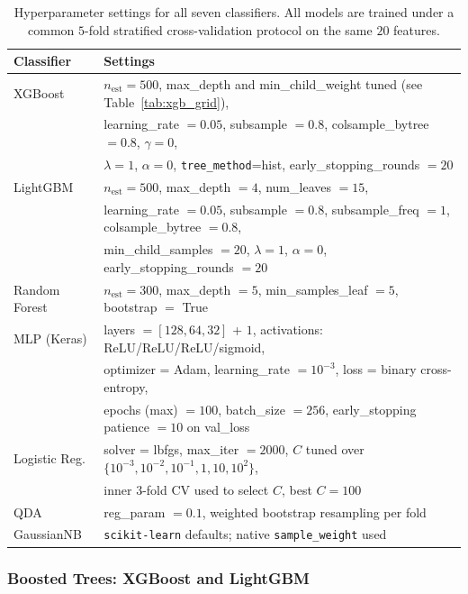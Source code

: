 \documentclass[conference]{IEEEtran}
\begin{document}
{\begin{table}[t]
\centering
\caption{Hyperparameter settings for all seven classifiers.
All models are trained under a common $5$-fold stratified
cross-validation protocol on the same $20$ features.}
\label{tab:hyperparameters}
\small
\begin{tabular}{l l}
\hline
\textbf{Classifier} & \textbf{Settings} \\
\hline
XGBoost      & $n_{\mathrm{est}}=500$, max\_depth and min\_child\_weight tuned (see Table~\ref{tab:xgb_grid}), \\
             & learning\_rate $=0.05$, subsample $=0.8$, colsample\_bytree $=0.8$, $\gamma=0$, \\
             & $\lambda=1$, $\alpha=0$, \texttt{tree\_method}=hist, early\_stopping\_rounds $=20$ \\
\hline
LightGBM     & $n_{\mathrm{est}}=500$, max\_depth $=4$, num\_leaves $=15$, \\
             & learning\_rate $=0.05$, subsample $=0.8$, subsample\_freq $=1$, colsample\_bytree $=0.8$, \\
             & min\_child\_samples $=20$, $\lambda=1$, $\alpha=0$, early\_stopping\_rounds $=20$ \\
\hline
Random Forest & $n_{\mathrm{est}}=300$, max\_depth $=5$, min\_samples\_leaf $=5$, bootstrap $=$ True \\
\hline
MLP (Keras)  & layers $=[128,64,32]$ + $1$, activations: ReLU/ReLU/ReLU/sigmoid, \\
             & optimizer = Adam, learning\_rate $=10^{-3}$, loss = binary cross-entropy, \\
             & epochs (max) $=100$, batch\_size $=256$, early\_stopping patience $=10$ on val\_loss \\
\hline
Logistic Reg.& solver = lbfgs, max\_iter $=2000$, $C$ tuned over $\{10^{-3},10^{-2},10^{-1},1,10,10^{2}\}$, \\
             & inner $3$-fold CV used to select $C$, best $C=100$ \\
\hline
QDA          & reg\_param $=0.1$, weighted bootstrap resampling per fold \\
\hline
GaussianNB   & \texttt{scikit-learn} defaults; native \texttt{sample\_weight} used \\
\hline
\end{tabular}
\end{table}
 
\subsubsection{Boosted Trees: XGBoost and LightGBM}
 
}
\end{document}

